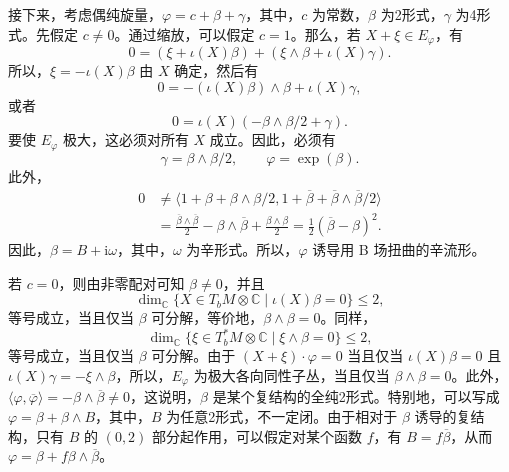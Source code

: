 \begin{example*}
接下来，考虑偶纯旋量，$\varphi=c+\beta+\gamma$，其中，$c$ 为常数，$\beta$ 为2形式，$\gamma$ 为4形式。先假定 $c\ne0$。通过缩放，可以假定 $c=1$。那么，若 $X+\xi\in E_\varphi$，有
\[
0=(\xi+\iota(X)\beta)+(\xi\wedge\beta+\iota(X)\gamma).
\]
所以，$\xi=-\iota(X)\beta$ 由 $X$ 确定，然后有
\[
0=-(\iota(X)\beta)\wedge\beta+\iota(X)\gamma,
\]
或者
\[
0=\iota(X)(-\beta\wedge\beta/2+\gamma).
\]
要使 $E_\varphi$ 极大，这必须对所有 $X$ 成立。因此，必须有
\[
\gamma=\beta\wedge\beta/2,
\qquad
\varphi=\exp(\beta).
\]
此外，
\[
\begin{aligned}
0&\ne\langle1+\beta+\beta\wedge\beta/2,
1+\overline\beta+\overline\beta\wedge\overline\beta/2\rangle\\
&=\frac{\overline\beta\wedge\overline\beta}{2}
-\beta\wedge\overline\beta+\frac{\beta\wedge\beta}{2}
=\tfrac12(\overline\beta-\beta)^2.
\end{aligned}
\]
因此，$\beta=B+\mathrm i\omega$，其中，$\omega$ 为辛形式。所以，$\varphi$ 诱导用 B 场扭曲的辛流形。

若 $c=0$，则由非零配对可知 $\beta\ne0$，并且
\[
\dim_{\mathbb C}\{X\in T_bM\otimes\mathbb C\mid\iota(X)\beta=0\}\leq2,
\]
等号成立，当且仅当 $\beta$ 可分解，等价地，$\beta\wedge\beta=0$。同样，
\[
\dim_{\mathbb C}\{\xi\in T_b^*M\otimes\mathbb C\mid\xi\wedge\beta=0\}\leq2,
\]
等号成立，当且仅当 $\beta$ 可分解。由于 $(X+\xi)\cdot\varphi=0$ 当且仅当 $\iota(X)\beta=0$ 且 $\iota(X)\gamma=-\xi\wedge\beta$，所以，$E_\varphi$ 为极大各向同性子丛，当且仅当 $\beta\wedge\beta=0$。此外，$\langle\varphi,\overline\varphi\rangle=-\beta\wedge\overline\beta\ne0$，这说明，$\beta$ 是某个复结构的全纯2形式。特别地，可以写成 $\varphi=\beta+\beta\wedge B$，其中，$B$ 为任意2形式，不一定闭。由于相对于 $\beta$ 诱导的复结构，只有 $B$ 的 $(0,2)$ 部分起作用，可以假定对某个函数 $f$，有 $B=f\overline\beta$，从而 $\varphi=\beta+f\beta\wedge\overline\beta$。
\end{example*}

